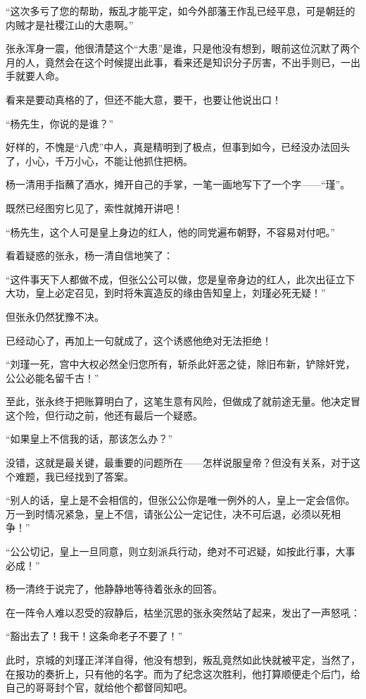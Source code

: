 \begin{multicols}{\theparacolNo}
		“这次多亏了您的帮助，叛乱才能平定，如今外部藩王作乱已经平息，可是朝廷的内贼才是社稷江山的大患啊。”

		张永浑身一震，他很清楚这个“大患”是谁，只是他没有想到，眼前这位沉默了两个月的人，竟然会在这个时候提出此事，看来还是知识分子厉害，不出手则已，一出手就要人命。

		看来是要动真格的了，但还不能大意，要干，也要让他说出口！

		“杨先生，你说的是谁？”

		好样的，不愧是“八虎”中人，真是精明到了极点，但事到如今，已经没办法回头了，小心，千万小心，不能让他抓住把柄。

		杨一清用手指蘸了酒水，摊开自己的手掌，一笔一画地写下了一个字——“瑾”。

		既然已经图穷匕见了，索性就摊开讲吧！

		“杨先生，这个人可是皇上身边的红人，他的同党遍布朝野，不容易对付吧。”

		看着疑惑的张永，杨一清自信地笑了：

		“这件事天下人都做不成，但张公公可以做，您是皇帝身边的红人，此次出征立下大功，皇上必定召见，到时将朱寘造反的缘由告知皇上，刘瑾必死无疑！”

		但张永仍然犹豫不决。

		已经动心了，再加上一句就成了，这个诱惑他绝对无法拒绝！

		“刘瑾一死，宫中大权必然全归您所有，斩杀此奸恶之徒，除旧布新，铲除奸党，公公必能名留千古！”

		至此，张永终于把账算明白了，这笔生意有风险，但做成了就前途无量。他决定冒这个险，但行动之前，他还有最后一个疑惑。

		“如果皇上不信我的话，那该怎么办？”

		没错，这就是最关键，最重要的问题所在——怎样说服皇帝？但没有关系，对于这个难题，我已经找到了答案。

		“别人的话，皇上是不会相信的，但张公公你是唯一例外的人，皇上一定会信你。万一到时情况紧急，皇上不信，请张公公一定记住，决不可后退，必须以死相争！”

		“公公切记，皇上一旦同意，则立刻派兵行动，绝对不可迟疑，如按此行事，大事必成！”

		杨一清终于说完了，他静静地等待着张永的回答。

		在一阵令人难以忍受的寂静后，枯坐沉思的张永突然站了起来，发出了一声怒吼：

		“豁出去了！我干！这条命老子不要了！”

		此时，京城的刘瑾正洋洋自得，他没有想到，叛乱竟然如此快就被平定，当然了，在报功的奏折上，只有他的名字。而为了纪念这次胜利，他打算顺便走个后门，给自己的哥哥封个官，就给他个都督同知吧。


\end{multicols}

